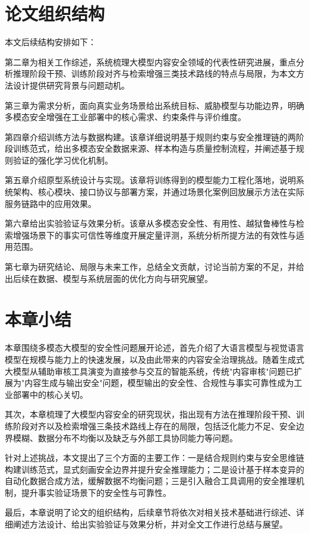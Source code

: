 \section{论文组织结构}
本文后续结构安排如下：

第二章为相关工作综述，系统梳理大模型内容安全领域的代表性研究进展，重点分析推理阶段干预、训练阶段对齐与检索增强三类技术路线的特点与局限，为本文方法设计提供研究背景与问题动机。

第三章为需求分析，面向真实业务场景给出系统目标、威胁模型与功能边界，明确多模态安全增强在工业部署中的核心需求、约束条件与评价维度。

第四章介绍训练方法与数据构建。该章详细说明基于规则约束与安全推理链的两阶段训练范式，给出多模态安全数据来源、样本构造与质量控制流程，并阐述基于规则验证的强化学习优化机制。

第五章介绍原型系统设计与实现。该章将训练得到的模型能力工程化落地，说明系统架构、核心模块、接口协议与部署方案，并通过场景化案例回放展示方法在实际服务链路中的应用效果。

第六章给出实验验证与效果分析。该章从多模态安全性、有用性、越狱鲁棒性与检索增强场景下的事实可信性等维度开展定量评测，系统分析所提方法的有效性与适用范围。

第七章为研究结论、局限与未来工作，总结全文贡献，讨论当前方案的不足，并给出后续在数据、模型与系统层面的优化方向与研究展望。

\section{本章小结}

本章围绕多模态大模型的安全性问题展开论述，首先介绍了大语言模型与视觉语言模型在规模与能力上的快速发展，以及由此带来的内容安全治理挑战。随着生成式大模型从辅助审核工具演变为直接参与交互的智能系统，传统"内容审核"问题已扩展为"内容生成与输出安全"问题，模型输出的安全性、合规性与事实可靠性成为工业部署中的核心关切。

其次，本章梳理了大模型内容安全的研究现状，指出现有方法在推理阶段干预、训练阶段对齐以及检索增强三条技术路线上存在的局限，包括泛化能力不足、安全边界模糊、数据分布不均衡以及缺乏与外部工具协同能力等问题。

针对上述挑战，本文提出了三个方面的主要工作：一是结合规则约束与安全思维链构建训练范式，显式刻画安全边界并提升安全推理能力；二是设计基于样本变异的自动化数据合成方法，缓解数据不均衡问题；三是引入融合工具调用的安全推理机制，提升事实验证场景下的安全性与可靠性。

最后，本章说明了论文的组织结构，后续章节将依次对相关技术基础进行综述、详细阐述方法设计、给出实验验证与效果分析，并对全文工作进行总结与展望。

